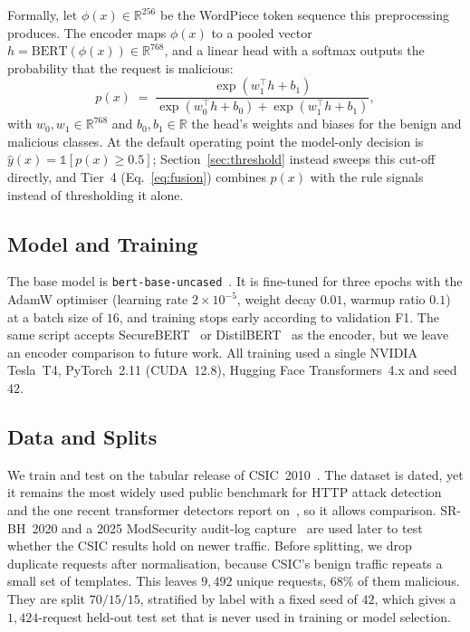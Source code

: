 \documentclass[conference]{IEEEtran}
\begin{document}
Formally, let $\phi(x)\in\mathbb{R}^{256}$ be the WordPiece token sequence
this preprocessing produces. The encoder maps $\phi(x)$ to a pooled vector
$h=\mathrm{BERT}(\phi(x))\in\mathbb{R}^{768}$, and a linear head with a
softmax outputs the probability that the request is malicious:
\begin{equation}
p(x) \;=\; \frac{\exp(w_1^\top h + b_1)}{\exp(w_0^\top h + b_0) + \exp(w_1^\top h + b_1)},
\label{eq:softmax}
\end{equation}
with $w_0,w_1\in\mathbb{R}^{768}$ and $b_0,b_1\in\mathbb{R}$ the head's
weights and biases for the benign and malicious classes. At the default
operating point the model-only decision is
$\hat y(x) = \mathbb{1}[p(x)\ge 0.5]$; Section~\ref{sec:threshold} instead
sweeps this cut-off directly, and Tier~4 (Eq.~\ref{eq:fusion}) combines
$p(x)$ with the rule signals instead of thresholding it alone.

\subsection{Model and Training}
The base model is \texttt{bert-base-uncased}~\cite{devlin2019bert}. It is
fine-tuned for three epochs with the AdamW optimiser (learning rate
$2{\times}10^{-5}$, weight decay $0.01$, warmup ratio $0.1$) at a batch
size of $16$, and training stops early according to validation F1. The
same script accepts SecureBERT~\cite{aghaei2022securebert,aghaei2025securebert2}
or DistilBERT~\cite{sanh2019distilbert} as the encoder, but we leave an
encoder comparison to future work. All training used a single NVIDIA
Tesla~T4, PyTorch~2.11 (CUDA~12.8), Hugging Face Transformers~4.x and
seed $42$.

\subsection{Data and Splits}
We train and test on the tabular release of
CSIC~2010~\cite{gimenez2010csic}. The dataset is dated, yet it remains the
most widely used public benchmark for HTTP attack detection and the one
recent transformer detectors report on~\cite{wadbert2026,scireports2024novelxsssqli},
so it allows comparison. SR-BH~2020 and a 2025 ModSecurity audit-log
capture~\cite{modsec30day2025} are used later to test whether the CSIC
results hold on newer traffic. Before splitting, we drop duplicate requests
after normalisation, because CSIC's benign traffic repeats a small set of
templates. This leaves $9{,}492$ unique requests, $68\%$ of them
malicious. They are split $70/15/15$, stratified by label with a fixed seed
of $42$, which gives a $1{,}424$-request held-out test set that is never
used in training or model selection.
\end{document}
